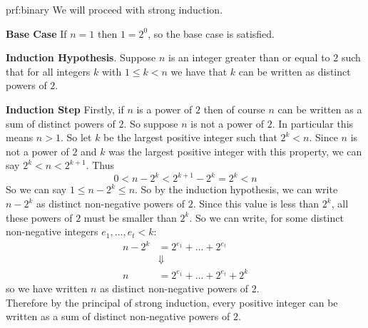 \begin{prf}{prf:binary} %
We will proceed with strong induction. 

\textbf{Base Case} If $n = 1$ then $1 = 2^0$, so the base case is satisfied. 

\textbf{Induction Hypothesis}. Suppose $n$ is an integer greater than or equal to $2$ such that for all integers $k$ with $1 \leq k < n$ we have that $k$ can be written as distinct powers of $2$. 


\textbf{Induction Step} Firstly, if $n$ is a power of $2$ then of course $n$ can be written as a sum of distinct powers of $2$. So suppose $n$ is not a power of $2$. In particular this means $n > 1$. So let $k$ be the largest positive integer such that $2^k < n$. Since $n$ is not a power of $2$ and $k$ was the largest positive integer with this property, we can say $2^k < n < 2^{k+1}$. Thus 
$$0 < n - 2^k < 2^{k+1}- 2^k = 2^k < n $$
So we can say $1 \leq n-2^k \leq n$. So by the induction hypothesis, we can write $n-2^k$ as distinct non-negative powers of $2$. Since this value is less than $2^k$, all these powers of $2$ must be smaller than $2^k$. So we can write, for some distinct non-negative integers $e_1, ..., e_t < k$:
\begin{align*}
    n - 2^k &= 2^{e_1} + ... + 2^{e_t}\\
    &\Downarrow\\
    n &= 2^{e_1} + ... + 2^{e_t} + 2^k
\end{align*}
so we have written $n$ as distinct non-negative powers of $2$. \\

Therefore by the principal of strong induction, every positive integer can be written as a sum of distinct non-negative powers of $2$.  
\end{prf}